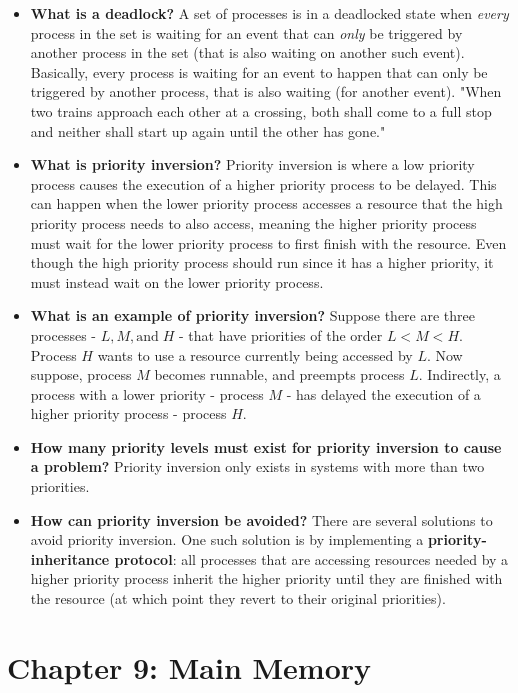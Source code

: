 \documentclass[12pt]{article}
\begin{document}
\begin{itemize}
    \item \textbf{What is a deadlock?} A set of processes is in a deadlocked state when \textit{every} process in the set is waiting for an event that can \textit{only} be triggered by another process in the set (that is also waiting on another such event). Basically, every process is waiting for an event to happen that can only be triggered by another process, that is also waiting (for another event). "When two trains approach each other at a crossing, both shall come to a full stop and neither shall start up again until the other has gone."
    \item \textbf{What is priority inversion?} Priority inversion is where a low priority process causes the execution of a higher priority process to be delayed. This can happen when the lower priority process accesses a resource that the high priority process needs to also access, meaning the higher priority process must wait for the lower priority process to first finish with the resource. Even though the high priority process should run since it has a higher priority, it must instead wait on the lower priority process.
    \item \textbf{What is an example of priority inversion?} Suppose there are three processes - \(L, M, \text{and} \; H\) - that have priorities of the order \(L < M < H\). Process \(H\) wants to use a resource currently being accessed by \(L\). Now suppose, process \(M\) becomes runnable, and preempts process \(L\). Indirectly, a process with a lower priority - process \(M\) - has delayed the execution of a higher priority process - process \(H\).
    \item \textbf{How many priority levels must exist for priority inversion to cause a problem?} Priority inversion only exists in systems with more than two priorities.
    \item \textbf{How can priority inversion be avoided?} There are several solutions to avoid priority inversion. One such solution is by implementing a \textbf{priority-inheritance protocol}: all processes that are accessing resources needed by a higher priority process inherit the higher priority until they are finished with the resource (at which point they revert to their original priorities).
\end{itemize}

\part*{Chapter 9: Main Memory}
\end{document}
